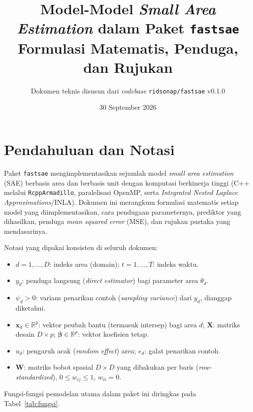 \documentclass[11pt,a4paper]{article}
\title{Model-Model \emph{Small Area Estimation} dalam Paket \texttt{fastsae} \\
\large Formulasi Matematis, Penduga, dan Rujukan}
\author{Dokumen teknis disusun dari \textit{codebase} \texttt{ridsonap/fastsae} v0.1.0}
\date{30 September 2026}
\theoremstyle{definition}
\begin{document}
\maketitle
\tableofcontents
\newpage

\section{Pendahuluan dan Notasi}

Paket \texttt{fastsae} mengimplementasikan sejumlah model \emph{small area estimation} (SAE)
berbasis area dan berbasis unit dengan komputasi berkinerja tinggi (C++ melalui
\texttt{RcppArmadillo}, paralelisasi OpenMP, serta \emph{Integrated Nested Laplace
Approximations}/INLA). Dokumen ini merangkum formulasi matematis setiap model yang
diimplementasikan, cara pendugaan parameternya, prediktor yang dihasilkan, penduga
\emph{mean squared error} (MSE), dan rujukan pustaka yang mendasarinya.

Notasi yang dipakai konsisten di seluruh dokumen:
\begin{itemize}[nosep]
  \item $d = 1,\dots,D$: indeks area (domain); $t = 1,\dots,T$: indeks waktu.
  \item $y_d$: penduga langsung (\emph{direct estimator}) bagi parameter area $\theta_d$.
  \item $\psi_d > 0$: varians penarikan contoh (\emph{sampling variance}) dari $y_d$,
        dianggap diketahui.
  \item $\mathbf{x}_d \in \mathbb{R}^p$: vektor peubah bantu (termasuk intersep) bagi area $d$;
        $\mathbf{X}$: matriks desain $D \times p$; $\boldsymbol{\beta} \in \mathbb{R}^p$:
        vektor koefisien tetap.
  \item $u_d$: pengaruh acak (\emph{random effect}) area; $e_d$: galat penarikan contoh.
  \item $\mathbf{W}$: matriks bobot spasial $D \times D$ yang dibakukan per baris
        (\emph{row-standardized}), $0 \le w_{ij} \le 1$, $w_{ii} = 0$.
\end{itemize}

Fungsi-fungsi pemodelan utama dalam paket ini diringkas pada Tabel~\ref{tab:fungsi}.
\end{document}
